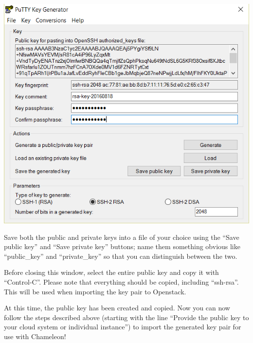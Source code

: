 \includegraphics[width=\columnwidth]{images/chameleon/putty3.png}

Save both the public and private keys into a file of your choice using
the ``Save public key'' and ``Save private key'' buttons; name them
something obvious like ``public\_key'' and ``private\_key'' so that you
can distinguish between the two.

Before closing this window, select the entire public key and copy it
with ``Control-C''. Please note that everything should be copied,
including ``ssh-rsa''. This will be used when importing the key pair to
Openstack.

At this time, the public key has been created and copied. Now you can
now follow the steps described above (starting with the line ``Provide
the public key to your cloud system or individual instance'') to import
the generated key pair for use with Chameleon!
